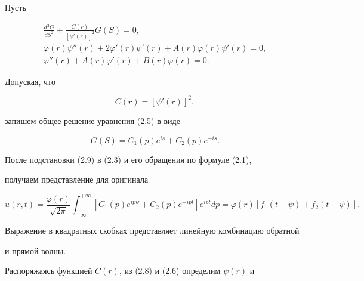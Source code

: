 \begin{case} 


Пусть 


\begin{gather} 


\frac{d^2G}{dS^2}+\frac{C(r)}{[\psi'(r)]^2}G(S)=0,\\ 


\varphi(r)\psi''(r)+2\varphi'(r)\psi'(r)+A(r) 


\varphi(r)\psi'(r)=0, \\ 


\varphi''(r)+A(r)\varphi'(r)+B(r)\varphi(r)=0. 


\end{gather} 


 


Допуская, что 


\begin{equation} 


C(r)=[\psi'(r)]^2, 


\end{equation} 


запишем общее решение уравнения (2.5) в виде 


\begin{equation} 


G(S)=C_1(p)e^{is}+C_2(p)e^{-is}. 


\end{equation} 


 


После подстановки (2.9) в (2.3) и его обращения по формуле (2.1), 


получаем представление для оригинала \cite{13} 


\begin{equation} 


u(r,t)=\frac{\varphi(r)}{\sqrt{2\pi}}\int^{+\infty}_{-\infty} 


[C_1(p)e^{ip\psi}+C_2(p)e^{-ipt}] 


e^{ipt}dp=\varphi(r)[f_1(t+\psi)+f_2(t-\psi)]. 


\end{equation} 


Выражение в квадратных скобках представляет линейную комбинацию обратной 


и прямой волны. 


 


Распоряжаясь функцией $C(r)$, из (2.8) и (2.6) определим $\psi(r)$ и 



\end{case}
